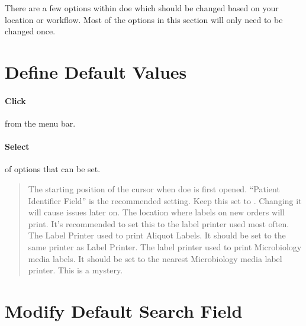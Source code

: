 There are a few options within \gls{doe} which should be changed based on your location or workflow. Most of the options in this section will only need to be changed once.

\section{Define Default Values\label{sec:doe_custom}}

\paragraph{Click}  from the menu bar.

\paragraph{Select} 

\begin{marginfigure}[-4\baselineskip]
\end{marginfigure}

 of options that can be set.
\begin{marginfigure}
\end{marginfigure}

\begin{quote}
    \begin{description}
         The starting position of the cursor when \gls{doe}  is first opened. {\color{deeporange900}``Patient Identifier Field''} is the recommended setting.
         Keep this set to . Changing it will cause issues later on.
         The location where labels on new orders will print. It's recommended to set this to the label printer used most often.
         The Label Printer used to print Aliquot Labels. It should be set to the same printer as Label Printer.
         The label printer used to print Microbiology media labels. It should be set to the nearest Microbiology media label printer.
         This is a mystery.
    \end{description}
\end{quote}

\section{Modify Default Search Field}

